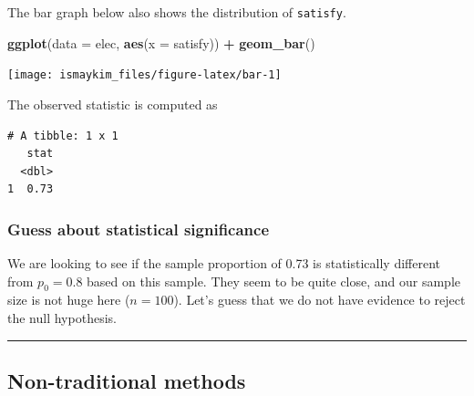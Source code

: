 \documentclass[12pt, krantz2,]{krantz}
\makeatletter
\newenvironment{Shaded}{\begin{snugshade}}{\end{snugshade}}
\newcommand{\DataTypeTok}[1]{\textcolor[rgb]{0.27,0.27,0.27}{#1}}
\newcommand{\KeywordTok}[1]{\textcolor[rgb]{0.27,0.27,0.27}{\textbf{#1}}}
\newcommand{\NormalTok}[1]{#1}
\newcommand{\OperatorTok}[1]{\textcolor[rgb]{0.43,0.43,0.43}{\textbf{#1}}}
\newcommand{\StringTok}[1]{\textcolor[rgb]{0.5,0.5,0.5}{#1}}
\newenvironment{kframe}{%
\medskip{}
\setlength{\fboxsep}{.8em}
 \def\at@end@of@kframe{}%
 \ifinner\ifhmode%
  \def\at@end@of@kframe{\end{minipage}}%
  \begin{minipage}{\columnwidth}%
 \fi\fi%
 \def\FrameCommand##1{\hskip\@totalleftmargin \hskip-\fboxsep
 \colorbox{shadecolor}{##1}\hskip-\fboxsep
     \hskip-\linewidth \hskip-\@totalleftmargin \hskip\columnwidth}%
 \MakeFramed {\advance\hsize-\width
   \@totalleftmargin\z@ \linewidth\hsize
   \@setminipage}}%
 {\par\unskip\endMakeFramed%
 \at@end@of@kframe}
\renewenvironment{Shaded}{\begin{kframe}}{\end{kframe}}
\makeatother
\begin{document}
The bar graph below also shows the distribution of \texttt{satisfy}.

\begin{Shaded}
\begin{Highlighting}[]
\KeywordTok{ggplot}\NormalTok{(}\DataTypeTok{data =}\NormalTok{ elec, }\KeywordTok{aes}\NormalTok{(}\DataTypeTok{x =}\NormalTok{ satisfy)) }\OperatorTok{+}\StringTok{ }
\StringTok{  }\KeywordTok{geom_bar}\NormalTok{()}
\end{Highlighting}
\end{Shaded}

\begin{center}\texttt{[image: ismaykim\_files/figure-latex/bar-1]} \end{center}

The observed statistic is computed as

\begin{Shaded}
\end{Shaded}

\begin{verbatim}
# A tibble: 1 x 1
   stat
  <dbl>
1  0.73
\end{verbatim}

\hypertarget{guess-about-statistical-significance-1}{%
\subsubsection*{Guess about statistical significance}\label{guess-about-statistical-significance-1}}


We are looking to see if the sample proportion of 0.73 is statistically different from \(p_0 = 0.8\) based on this sample. They seem to be quite close, and our sample size is not huge here (\(n = 100\)). Let's guess that we do not have evidence to reject the null hypothesis.

\begin{center}\rule{0.5\linewidth}{\linethickness}\end{center}

\hypertarget{non-traditional-methods-1}{%
\subsection{Non-traditional methods}\label{non-traditional-methods-1}}
\end{document}
